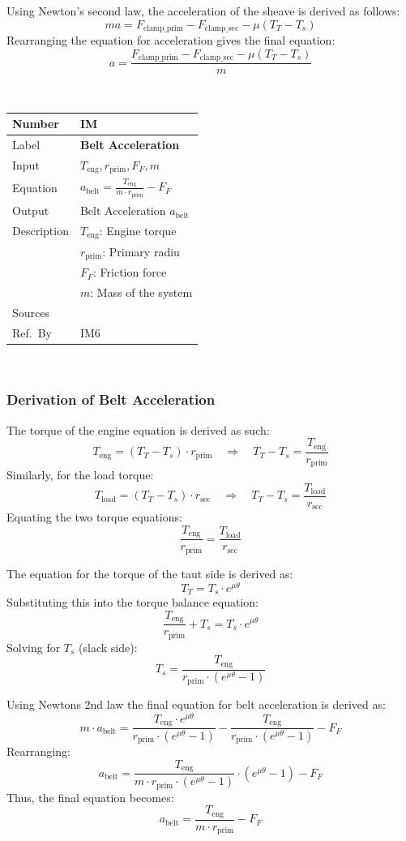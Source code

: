 \documentclass[12pt]{article}
\newcommand{\colAwidth}{0.13\textwidth}
\newcommand{\colBwidth}{0.82\textwidth}
\newcounter{instnum} %
\newcommand{\definstance}[7] {
~\newline
\noindent
\begin{minipage}{\textwidth}
\renewcommand*{\arraystretch}{1.5}
\begin{tabular}{| p{\colAwidth} | p{\colBwidth}|}
  \hline
  \rowcolor[gray]{0.9}
  Number& IM\refstepcounter{instnum}\theinstnum \label{inst:\theinstnum}\\
  \hline
  Label& \bf #1 \\
  \hline
  Input& #2\\
  \hline
  Equation& #3\\
  \hline
  Output& #4\\
  \hline
  Description& #5 \\
  \hline
  Sources& #6 \\
  \hline
  Ref.\ By & #7\\
  \hline
\end{tabular}
\end{minipage}\\
}
\begin{document}
Using Newton's second law, the acceleration of the sheave is derived as follows:
\[ma = F_{\text{clamp\_prim}} - F_{\text{clamp\_sec}} - \mu (T_T - T_s)\]
Rearranging the equation for acceleration gives the final equation:
\[a = \frac{F_{\text{clamp\_prim}} - F_{\text{clamp\_sec}} - \mu (T_T - T_s)}{m}\]



\definstance
{Belt Acceleration}
{$T_{\text{eng}}, r_{\text{prim}}, F_F, m$ } %
{$a_{\text{belt}} = \frac{T_{\text{eng}}}{m \cdot r_{\text{prim}}} - F_F$} %
{Belt Acceleration $a_{\text{belt}}$} %
{$T_{\text{eng}}$: Engine torque\\
   &$r_{\text{prim}}$: Primary radiu\\
   &$F_F$: Friction force\\
   &$m$: Mass of the system} %
{} %
{IM6} %
\subsubsection*{Derivation of Belt Acceleration}

The torque of the engine equation is derived as such: \\
\[T_{\text{eng}} = (T_T - T_s) \cdot r_{\text{prim}} \quad \Rightarrow \quad T_T - T_s = \frac{T_{\text{eng}}}{r_{\text{prim}}}\]
Similarly, for the load torque: \\
\[T_{\text{load}} = (T_T - T_s) \cdot r_{\text{sec}} \quad \Rightarrow \quad T_T - T_s = \frac{T_{\text{load}}}{r_{\text{sec}}}\]
Equating the two torque equations: \\
\[\frac{T_{\text{eng}}}{r_{\text{prim}}} = \frac{T_{\text{load}}}{r_{\text{sec}}}\]
{\newline}

The equation for the torque of the taut side is derived as: \\
\[T_T = T_s \cdot e^{\mu \theta}\]
Substituting this into the torque balance equation: \\
\[\frac{T_{\text{eng}}}{r_{\text{prim}}} + T_s = T_s \cdot e^{\mu \theta}\]
Solving for \(T_s\) (slack side): \\
\[T_s = \frac{T_{\text{eng}}}{r_{\text{prim}} \cdot (e^{\mu \theta} - 1)}\]
{\newline}

Using Newtons 2nd law the final equation for belt acceleration is derived as: \\
\[m \cdot a_{\text{belt}} = \frac{T_{\text{eng}} \cdot e^{\mu \theta}}{r_{\text{prim}} \cdot (e^{\mu \theta} - 1)} - \frac{T_{\text{eng}}}{r_{\text{prim}} \cdot (e^{\mu \theta} - 1)} - F_F\]
Rearranging: \\
\[a_{\text{belt}} = \frac{T_{\text{eng}}}{m \cdot r_{\text{prim}} \cdot (e^{\mu \theta} - 1)} \cdot (e^{\mu \theta} - 1) - F_F\]
Thus, the final equation becomes: \\
\[a_{\text{belt}} = \frac{T_{\text{eng}}}{m \cdot r_{\text{prim}}} - F_F\]
\end{document}
